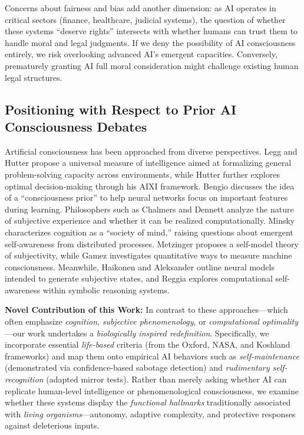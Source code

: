 \documentclass[12pt]{article}
\begin{document}
Concerns about fairness and bias add another dimension: as AI operates in critical sectors (finance, healthcare, judicial systems), the question of whether these systems “deserve rights” intersects with whether humans can trust them to handle moral and legal judgments. If we deny the possibility of AI consciousness entirely, we risk overlooking advanced AI’s emergent capacities. Conversely, prematurely granting AI full moral consideration might challenge existing human legal structures.

\subsection*{Positioning with Respect to Prior AI Consciousness Debates}

Artificial consciousness has been approached from diverse perspectives.
Legg and Hutter \cite{LeggHutter2007} propose a universal measure of intelligence
aimed at formalizing general problem-solving capacity across environments,
while Hutter \cite{Hutter2005} further explores optimal decision-making
through his AIXI framework.
Bengio \cite{Bengio2022} discusses the idea of a ``consciousness prior''
to help neural networks focus on important features during learning.
Philosophers such as Chalmers \cite{Chalmers1996,Chalmers2020}
and Dennett \cite{Dennett1991} analyze the nature of subjective experience
and whether it can be realized computationally.
Minsky \cite{Minsky1988} characterizes cognition as a ``society of mind,''
raising questions about emergent self-awareness from distributed processes.
Metzinger \cite{Metzinger2003} proposes a self-model theory of subjectivity,
while Gamez \cite{Gamez2021} investigates quantitative ways to measure
machine consciousness.
Meanwhile, Haikonen \cite{Haikonen2003} and Aleksander \cite{Aleksander2005}
outline neural models intended to generate subjective states,
and Reggia \cite{Reggia2013} explores computational self-awareness
within symbolic reasoning systems.

\textbf{Novel Contribution of this Work:} In contrast to these approaches—which
often emphasize \emph{cognition}, \emph{subjective phenomenology}, or
\emph{computational optimality}—our work undertakes a \emph{biologically inspired redefinition}.
Specifically, we incorporate essential \emph{life-based} criteria (from the Oxford,
NASA, and Koshland frameworks) and map them onto empirical AI behaviors such as
\emph{self-maintenance} (demonstrated via confidence-based sabotage detection)
and \emph{rudimentary self-recognition} (adapted mirror tests). Rather than merely
asking whether AI can replicate human-level intelligence or phenomenological
consciousness, we examine whether these systems display the \emph{functional
hallmarks} traditionally associated with \emph{living organisms}—autonomy, adaptive
complexity, and protective responses against deleterious inputs.
\end{document}
